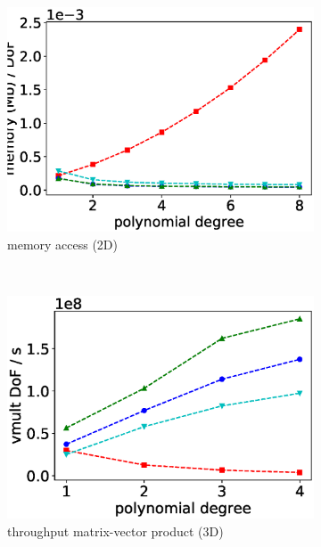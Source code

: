 \documentclass[AMA,STIX1COL]{WileyNJD-v2}
\begin{document}
\begin{figure}
\begin{subfigure}[b]{0.32\textwidth}
      \centering
      \includegraphics[width=\textwidth]{IWR_newest_patched_memory2d-nolables.eps}
      \caption{memory access (2D)}
      \label{fig:benchmark_miehe_IWR_memory2}
  \end{subfigure}
  ~
  \begin{subfigure}[b]{0.32\textwidth}
    \centering
    \includegraphics[width=\textwidth]{IWR_newest_patched_throughput3d-nolables.eps}
    \caption{throughput matrix-vector product (3D)}
  \end{subfigure}
  \begin{subfigure}[b]{0.32\textwidth}
    \centering

\end{subfigure}
\end{figure}
\end{document}

